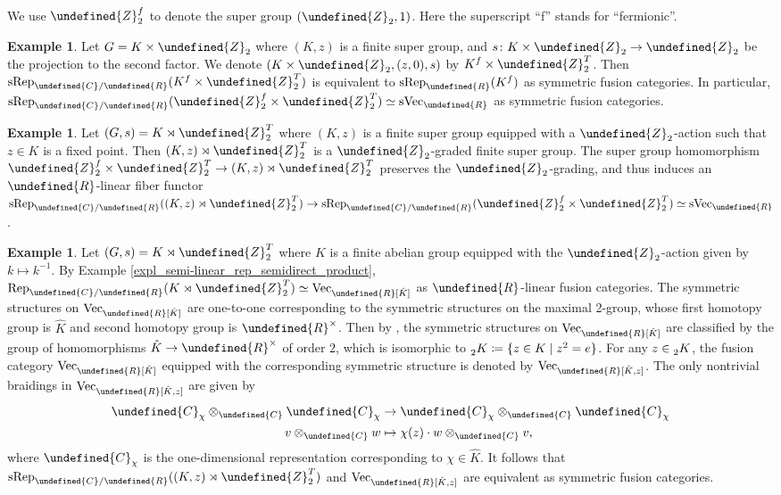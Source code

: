 \documentclass[10pt]{article}
\let\mathbb\undefined
\theoremstyle{definition}
\newtheorem{expl}[thm]{Example}
\numberwithin{equation}{section}
\numberwithin{thm}{section}
\newcommand{\Cb}{\mathbb{C}}
\newcommand{\Rb}{\mathbb{R}}
\newcommand{\Zb}{\mathbb{Z}}
\newcommand{\vect}{\mathrm{Vec}}
\newcommand{\svect}{\mathrm{sVec}}
\newcommand{\rep}{\mathrm{Rep}}
\newcommand{\srep}{\mathrm{sRep}}
\begin{document}
We use $\Zb_2^f$ to denote the super group $(\Zb_2,1)$. Here the superscript ``f'' stands for ``fermionic''.

\begin{expl}
Let $G = K \times \Zb_2$ where $(K,z)$ is a finite super group, and $s \colon K \times \Zb_2 \to \Zb_2$ be the projection to the second factor. We denote $(K \times \Zb_2,(z,0),s)$ by $K^f \times \Zb_2^T$. Then $\srep_{\Cb/\Rb}(K^f \times \Zb_2^T)$ is equivalent to $\srep_\Rb(K^f)$ as symmetric fusion categories. In particular, $\srep_{\Cb/\Rb}(\Zb_2^f \times \Zb_2^T) \simeq \svect_\Rb$ as symmetric fusion categories.
\end{expl}

\begin{expl}
Let $(G,s) = K \rtimes \Zb_2^T$ where $(K,z)$ is a finite super group equipped with a $\Zb_2$-action such that $z \in K$ is a fixed point. Then $(K,z) \rtimes \Zb_2^T$ is a $\Zb_2$-graded finite super group. The super group homomorphism $\Zb_2^f \times \Zb_2^T \to (K,z) \rtimes \Zb_2^T$ preserves the $\Zb_2$-grading, and thus induces an $\Rb$-linear fiber functor $\srep_{\Cb/\Rb}((K,z) \rtimes \Zb_2^T) \to \srep_{\Cb/\Rb}(\Zb_2^f \times \Zb_2^T) \simeq \svect_\Rb$.
\end{expl}

\begin{expl}
Let $(G,s) = K \rtimes \Zb_2^T$ where $K$ is a finite abelian group equipped with the $\Zb_2$-action given by $k \mapsto k^{-1}$. By Example \ref{expl_semi-linear_rep_semidirect_product}, $\rep_{\Cb/\Rb}(K \rtimes \Zb_2^T) \simeq \vect_\Rb[\hat K]$ as $\Rb$-linear fusion categories. The symmetric structures on $\vect_\Rb[\hat K]$ are one-to-one corresponding to the symmetric structures on the maximal 2-group, whose first homotopy group is $\hat K$ and second homotopy group is $\Rb^\times$. Then by \cite[Theorem 3.3]{JS93}, the symmetric structures on $\vect_\Rb[\hat K]$ are classified by the group of homomorphisms $\hat K \to \Rb^\times$ of order $2$, which is isomorphic to $\prescript{}{2}{K} \coloneqq \{z \in K \mid z^2 = e\}$. For any $z \in \prescript{}{2}{K}$, the fusion category $\vect_\Rb[\hat K]$ equipped with the corresponding symmetric structure is denoted by $\vect_\Rb[\hat K,z]$. The only nontrivial braidings in $\vect_\Rb[\hat K,z]$ are given by
\begin{align*}
\Cb_\chi \otimes_\Cb \Cb_\chi & \to \Cb_\chi \otimes_\Cb \Cb_\chi \\
v \otimes_\Cb w & \mapsto \chi(z) \cdot w \otimes_\Cb v ,
\end{align*}
where $\Cb_\chi$ is the one-dimensional representation corresponding to $\chi \in \hat K$. It follows that $\srep_{\Cb/\Rb}((K,z) \rtimes \Zb_2^T)$ and $\vect_\Rb[\hat K,z]$ are equivalent as symmetric fusion categories.
\end{expl}
\end{document}
